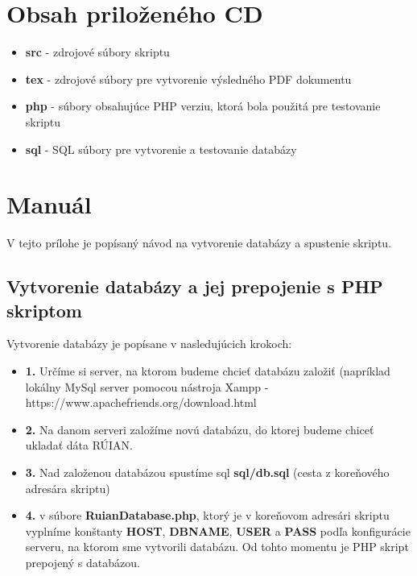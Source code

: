 
\chapter{Obsah priloženého CD}
\begin{itemize}
    \item {{\bf src}} - zdrojové súbory skriptu
    \item{{\bf tex}} - zdrojové súbory pre vytvorenie výsledného PDF dokumentu
    \item{{\bf php}} - súbory obsahujúce PHP verziu, ktorá bola použitá pre testovanie skriptu
    \item{{\bf sql}} - SQL súbory pre vytvorenie a testovanie databázy
\end{itemize}

\chapter{Manuál}
\label{manual}
V tejto prílohe je popísaný návod na vytvorenie databázy a spustenie skriptu.
\section {Vytvorenie databázy a jej prepojenie s PHP skriptom}
Vytvorenie databázy je popísane v nasledujúcich krokoch: 
\begin{itemize}
    \item {{\bf 1.}} Určíme si server, na ktorom budeme chcieť databázu založiť (napríklad lokálny MySql server pomocou nástroja Xampp - https://www.apachefriends.org/download.html
    \item {{\bf 2.}} Na danom serveri založíme novú databázu, do ktorej budeme chiceť ukladať dáta RÚIAN.
    \item{{\bf 3.} Nad založenou databázou spustíme sql {\bf sql/db.sql} (cesta z koreňového adresára skriptu)}
    \item{{\bf 4.} v súbore {\bf RuianDatabase.php}, ktorý je v koreňovom adresári skriptu vyplníme konštanty {\bf HOST}, {\bf DBNAME}, {\bf USER} a {\bf PASS} podľa konfigurácie serveru, na ktorom sme vytvorili databázu. Od tohto momentu je PHP skript prepojený s databázou.}
\end{itemize}
